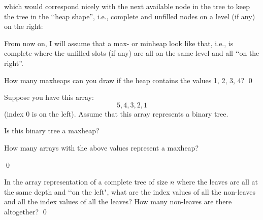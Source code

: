 

which would correspond nicely with the
next available node in the tree to keep the tree
in the \lq\lq heap shape'',
i.e., complete and unfilled nodes on a level
(if any) on the right:



From now on, I will assume that a max- or minheap
look like that,
i.e., is complete where the unfilled slots (if any)
are all on the same level
and all \lq\lq on the right''.

\newpage
\begin{ex}
How many maxheaps can you draw if the heap contains
the values 1, 2, 3, 4?
\qed
\end{ex}


\newpage
\begin{ex}
Suppose you have this array:
\[
5, 4, 3, 2, 1
\]
(index 0 is on the left).
Assume that this array represents a binary tree.
\begin{tightlist}
  \item Is this binary tree a maxheap?
  \item How many arrays with the above values represent a maxheap?
\end{tightlist}
\qed
\end{ex}

\newpage
\begin{ex}
  In the array representation of a complete tree of size $n$ where
  the leaves are all at the same depth and \lq\lq on the left",
  what are the index values of all the non-leaves
  and all the index values of all the leaves?
  How many non-leaves are there altogether?
  \qed
\end{ex}
